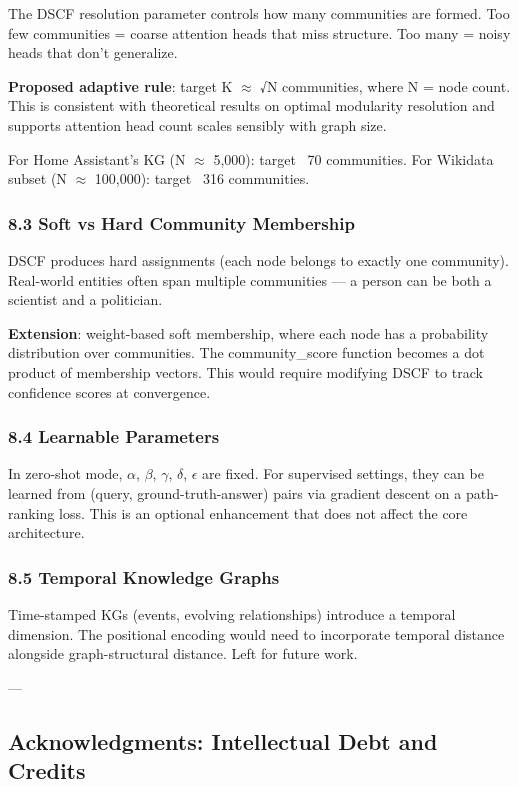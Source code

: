 \documentclass[10pt,journal,compsoc]{IEEEtran}
\begin{document}
The DSCF resolution parameter controls how many communities are formed. Too
few communities = coarse attention heads that miss structure. Too many = noisy
heads that don't generalize.

\textbf{Proposed adaptive rule}: target K $\approx$ √N communities, where N = node count.
This is consistent with theoretical results on optimal modularity resolution
and supports attention head count scales sensibly with graph size.

For Home Assistant's KG (N $\approx$ 5,000): target ~70 communities.
For Wikidata subset (N $\approx$ 100,000): target ~316 communities.

\subsubsection{8.3 Soft vs Hard Community Membership}

DSCF produces hard assignments (each node belongs to exactly one community).
Real-world entities often span multiple communities — a person can be both
a scientist and a politician.

\textbf{Extension}: weight-based soft membership, where each node has a probability
distr\-ibution over communities. The community\_score function becomes a
dot product of membership vectors. This would require modifying DSCF to track
confidence scores at convergence.

\subsubsection{8.4 Learnable Parameters}

In zero-shot mode, $\alpha$, $\beta$, $\gamma$, $\delta$, $\epsilon$ are fixed. For supervised settings, they
can be learned from (query, ground-truth-answer) pairs via gradient descent
on a path-ranking loss. This is an optional enhancement that does not affect
the core archi\-tecture.

\subsubsection{8.5 Temporal Knowledge Graphs}

Time-stamped KGs (events, evolving relat\-ionships) introduce a temporal
dimension. The positional encoding would need to incorporate temporal distance
alongside graph-structural distance. Left for future work.

---

\subsection{Acknow\-ledgments: Intell\-ectual Debt and Credits}
\end{document}
